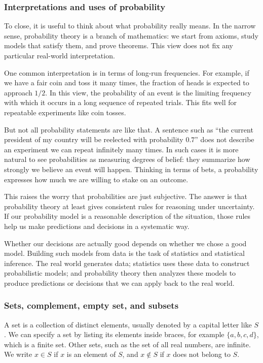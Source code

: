 \subsubsection{Interpretations and uses of probability}

To close, it is useful to think about what probability really means. In the narrow sense, probability theory is a branch of mathematics: we start from axioms, study models that satisfy them, and prove theorems. This view does not fix any particular real-world interpretation.

One common interpretation is in terms of long-run frequencies. For example, if we have a fair coin and toss it many times, the fraction of heads is expected to approach \(1/2\). In this view, the probability of an event is the limiting frequency with which it occurs in a long sequence of repeated trials. This fits well for repeatable experiments like coin tosses.

But not all probability statements are like that. A sentence such as “the current president of my country will be reelected with probability \(0.7\)” does not describe an experiment we can repeat infinitely many times. In such cases it is more natural to see probabilities as measuring degrees of belief: they summarize how strongly we believe an event will happen. Thinking in terms of bets, a probability expresses how much we are willing to stake on an outcome.

This raises the worry that probabilities are just subjective. The answer is that probability theory at least gives consistent rules for reasoning under uncertainty. If our probability model is a reasonable description of the situation, those rules help us make predictions and decisions in a systematic way.

Whether our decisions are actually good depends on whether we chose a good model. Building such models from data is the task of statistics and statistical inference. The real world generates data; statistics uses these data to construct probabilistic models; and probability theory then analyzes these models to produce predictions or decisions that we can apply back to the real world.


\subsubsection{Sets, complement, empty set, and subsets}

A set is a collection of distinct elements, usually denoted by a capital letter like \(S\). We can specify a set by listing its elements inside braces, for example \(\{a,b,c,d\}\), which is a finite set. Other sets, such as the set of all real numbers, are infinite. We write \(x \in S\) if \(x\) is an element of \(S\), and \(x \notin S\) if \(x\) does not belong to \(S\).

